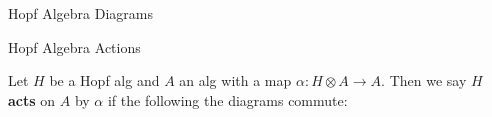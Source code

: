 \documentclass{beamer}
\begin{document}
\begin{frame}[fragile]{Hopf Algebra Diagrams}
\begin{itemize}
\end{itemize}
\end{frame}

\begin{frame}[fragile]{Hopf Algebra Actions}

Let $H$ be a Hopf alg and $A$ an alg with a map $\alpha:H\otimes A\to A$. Then we say $H$ \textbf{acts} on $A$ by $\alpha$ if the following the diagrams commute:


\end{frame}
\end{document}
